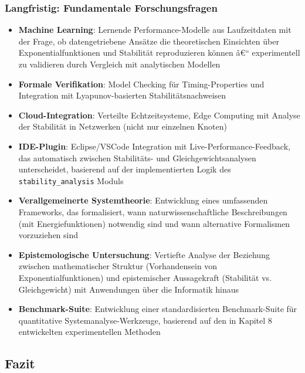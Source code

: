 ﻿\documentclass[a4paper,12pt]{scrreprt}
\theoremstyle{definition}
\begin{document}
\subsubsection{Langfristig: Fundamentale Forschungsfragen}

\begin{itemize}
	\item[-] \textbf{Machine Learning}: Lernende Performance-Modelle aus Laufzeitdaten mit der Frage, ob datengetriebene Ansätze die theoretischen Einsichten über Exponentialfunktionen und Stabilität reproduzieren können â€“ experimentell zu validieren durch Vergleich mit analytischen Modellen
	
	\item[-] \textbf{Formale Verifikation}: Model Checking für Timing-Properties und Integration mit Lyapunov-basierten Stabilitätsnachweisen
	
	\item[-] \textbf{Cloud-Integration}: Verteilte Echtzeitsysteme, Edge Computing mit Analyse der Stabilität in Netzwerken (nicht nur einzelnen Knoten)
	
	\item[-] \textbf{IDE-Plugin}: Eclipse/VSCode Integration mit Live-Performance-Feedback, das automatisch zwischen Stabilitäts- und Gleichgewichtsanalysen unterscheidet, basierend auf der implementierten Logik des \texttt{stability\_analysis} Moduls
	
	\item[-] \textbf{Verallgemeinerte Systemtheorie}: Entwicklung eines umfassenden Frameworks, das formalisiert, wann naturwissenschaftliche Beschreibungen (mit Energiefunktionen) notwendig sind und wann alternative Formalismen vorzuziehen sind
	
	\item[-] \textbf{Epistemologische Untersuchung}: Vertiefte Analyse der Beziehung zwischen mathematischer Struktur (Vorhandensein von Exponentialfunktionen) und epistemischer Aussagekraft (Stabilität vs. Gleichgewicht) mit Anwendungen über die Informatik hinaus
	
	\item[-] \textbf{Benchmark-Suite}: Entwicklung einer standardisierten Benchmark-Suite für quantitative Systemanalyse-Werkzeuge, basierend auf den in Kapitel 8 entwickelten experimentellen Methoden
\end{itemize}

\subsection{Fazit}
\label{subsec:fazit}
\end{document}
